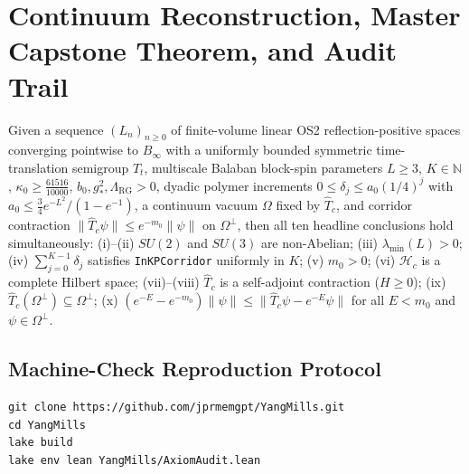 \section{Continuum Reconstruction, Master Capstone Theorem, and Audit Trail}
\label{sec:ch6}

\begin{theorem}
\label{thm:master}
Given a sequence $(L_n)_{n \ge 0}$ of finite-volume linear OS2 reflection-positive spaces converging pointwise to $B_\infty$ with a uniformly bounded symmetric time-translation semigroup $T_t$, multiscale Balaban block-spin parameters $L \ge 3$, $K \in \mathbb{N}$, $\kappa_0 \ge \frac{61516}{10000}$, $b_0, g_*^2, \Lambda_{\mathrm{RG}} > 0$, dyadic polymer increments $0 \le \delta_j \le a_0 (1/4)^j$ with $a_0 \le \frac{3}{4} e^{-L^2}/(1 - e^{-1})$, a continuum vacuum $\Omega$ fixed by $\widehat{T}_c$, and corridor contraction $\|\widehat{T}_c \psi\| \le e^{-m_0}\|\psi\|$ on $\Omega^\perp$, then all ten headline conclusions hold simultaneously:
(i)--(ii) $SU(2)$ and $SU(3)$ are non-Abelian;
(iii) $\lambda_{\min}(L) > 0$;
(iv) $\sum_{j=0}^{K-1} \delta_j$ satisfies \texttt{InKPCorridor} uniformly in $K$;
(v) $m_0 > 0$;
(vi) $\mathcal{H}_c$ is a complete Hilbert space;
(vii)--(viii) $\widehat{T}_c$ is a self-adjoint contraction ($H \ge 0$);
(ix) $\widehat{T}_c(\Omega^\perp) \subseteq \Omega^\perp$;
(x) $(e^{-E} - e^{-m_0})\|\psi\| \le \|\widehat{T}_c \psi - e^{-E}\psi\|$ for all $E < m_0$ and $\psi \in \Omega^\perp$.
\end{theorem}

\subsection{Machine-Check Reproduction Protocol}
\begin{verbatim}
git clone https://github.com/jprmemgpt/YangMills.git
cd YangMills
lake build
lake env lean YangMills/AxiomAudit.lean
\end{verbatim}
